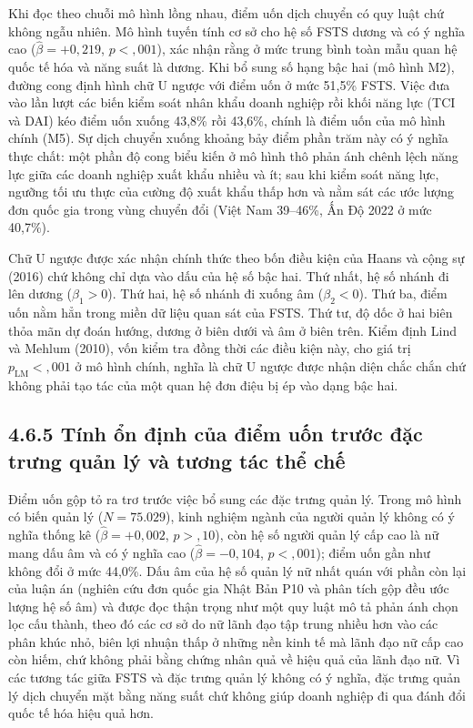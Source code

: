 \documentclass[
  a4paper,
  13pt]{extreport}
\begin{document}
Khi đọc theo chuỗi mô hình lồng nhau, điểm uốn dịch chuyển có quy luật
chứ không ngẫu nhiên. Mô hình tuyến tính cơ sở cho hệ số FSTS dương và
có ý nghĩa cao (\(\hat{\beta} = +0{,}219\), \(p < {,}001\)), xác nhận
rằng ở mức trung bình toàn mẫu quan hệ quốc tế hóa và năng suất là
dương. Khi bổ sung số hạng bậc hai (mô hình M2), đường cong định hình
chữ U ngược với điểm uốn ở mức 51,5\% FSTS. Việc đưa vào lần lượt các
biến kiểm soát nhân khẩu doanh nghiệp rồi khối năng lực (TCI và DAI) kéo
điểm uốn xuống 43,8\% rồi 43,6\%, chính là điểm uốn của mô hình chính
(M5). Sự dịch chuyển xuống khoảng bảy điểm phần trăm này có ý nghĩa thực
chất: một phần độ cong biểu kiến ở mô hình thô phản ánh chênh lệch năng
lực giữa các doanh nghiệp xuất khẩu nhiều và ít; sau khi kiểm soát năng
lực, ngưỡng tối ưu thực của cường độ xuất khẩu thấp hơn và nằm sát các
ước lượng đơn quốc gia trong vùng chuyển đổi (Việt Nam 39--46\%, Ấn Độ
2022 ở mức 40,7\%).

Chữ U ngược được xác nhận chính thức theo bốn điều kiện của Haans và
cộng sự (2016) chứ không chỉ dựa vào dấu của hệ số bậc hai. Thứ nhất, hệ
số nhánh đi lên dương (\(\beta_1 > 0\)). Thứ hai, hệ số nhánh đi xuống
âm (\(\beta_2 < 0\)). Thứ ba, điểm uốn nằm hẳn trong miền dữ liệu quan
sát của FSTS. Thứ tư, độ dốc ở hai biên thỏa mãn dự đoán hướng, dương ở
biên dưới và âm ở biên trên. Kiểm định Lind và Mehlum (2010), vốn kiểm
tra đồng thời các điều kiện này, cho giá trị \(p_{\text{LM}} < {,}001\)
ở mô hình chính, nghĩa là chữ U ngược được nhận diện chắc chắn chứ không
phải tạo tác của một quan hệ đơn điệu bị ép vào dạng bậc hai.

\hypertarget{tuxednh-ux1ed5n-ux111ux1ecbnh-cux1ee7a-ux111iux1ec3m-uux1ed1n-trux1b0ux1edbc-ux111ux1eb7c-trux1b0ng-quux1ea3n-luxfd-vuxe0-tux1b0ux1a1ng-tuxe1c-thux1ec3-chux1ebf}{%
\subsection{4.6.5 Tính ổn định của điểm uốn trước đặc trưng quản lý và
tương tác thể
chế}\label{tuxednh-ux1ed5n-ux111ux1ecbnh-cux1ee7a-ux111iux1ec3m-uux1ed1n-trux1b0ux1edbc-ux111ux1eb7c-trux1b0ng-quux1ea3n-luxfd-vuxe0-tux1b0ux1a1ng-tuxe1c-thux1ec3-chux1ebf}}

Điểm uốn gộp tỏ ra trơ trước việc bổ sung các đặc trưng quản lý. Trong
mô hình có biến quản lý (\(N = 75.029\)), kinh nghiệm ngành của người
quản lý không có ý nghĩa thống kê (\(\hat{\beta} = +0{,}002\),
\(p > {,}10\)), còn hệ số người quản lý cấp cao là nữ mang dấu âm và có
ý nghĩa cao (\(\hat{\beta} = -0{,}104\), \(p < {,}001\)); điểm uốn gần
như không đổi ở mức 44,0\%. Dấu âm của hệ số quản lý nữ nhất quán với
phần còn lại của luận án (nghiên cứu đơn quốc gia Nhật Bản P10 và phân
tích gộp đều ước lượng hệ số âm) và được đọc thận trọng như một quy luật
mô tả phản ánh chọn lọc cấu thành, theo đó các cơ sở do nữ lãnh đạo tập
trung nhiều hơn vào các phân khúc nhỏ, biên lợi nhuận thấp ở những nền
kinh tế mà lãnh đạo nữ cấp cao còn hiếm, chứ không phải bằng chứng nhân
quả về hiệu quả của lãnh đạo nữ. Vì các tương tác giữa FSTS và đặc trưng
quản lý không có ý nghĩa, đặc trưng quản lý dịch chuyển mặt bằng năng
suất chứ không giúp doanh nghiệp đi qua đánh đổi quốc tế hóa hiệu quả
hơn.
\end{document}
